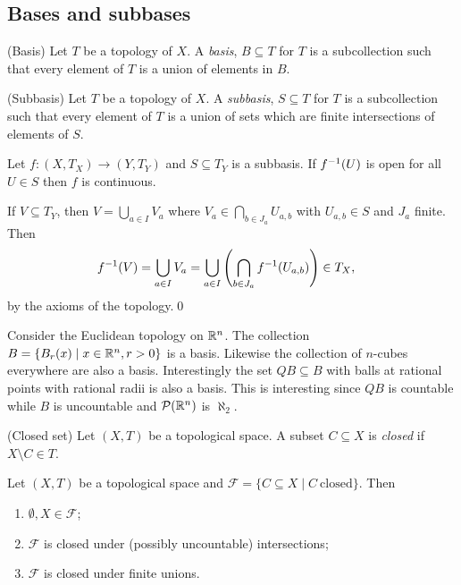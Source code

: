 \documentclass{article}
\begin{document}
\subsection{Bases and subbases}
\begin{definition}
(Basis) Let $ T $ be a topology of $ X $. A \textit{basis}, $ B\subseteq T $ for $ T $ is a subcollection such that every element of $ T $ is a union of elements in $ B $.
\end{definition}
\begin{definition}
	(Subbasis) Let $ T $ be a topology of $ X $. A \textit{subbasis}, $ S\subseteq T $ for $ T $ is a subcollection such that every element of $ T $ is a union of sets which are finite intersections of elements of $ S $.
\end{definition}
\begin{lemma}
  Let $ f:(X,T_X)\to (Y,T_Y) $ and $ S\subseteq T_Y $ is a subbasis. If $ {f}^{-1}(U) $ is open for all $ U\in S $ then $ f $ is continuous.
\end{lemma}
\pf If $ V\subseteq T_Y $, then $ V=\bigcup_{a\in I}V_a $ where $ V_a\in \bigcap_{b\in J_a}U_{a,b} $ with $U_{a,b}\in S $ and $ J_a $ finite. Then
\begin{align*}
	{f}^{-1}(V) = \bigcup_{a\in I}V_a &= \bigcup_{a\in I}\left(\bigcap_{b\in J_a}{f}^{-1}(U_{a,b})\right)\in T_X,
\end{align*}
by the axioms of the topology.\qed
\par
Consider the Euclidean topology on $ \mathbb{R}^n $. The collection $ B= \{B_r(x)\mid x\in \mathbb{R}^n, r>0\} $ is a basis. Likewise the collection of $ n $-cubes everywhere are also a basis. Interestingly the set $ QB \subseteq B $ with balls at rational points with rational radii is also a basis. This is interesting since $ QB $ is countable while $ B $ is uncountable and $ \mathcal P(\mathbb{R}^n) $ is $ \aleph_2 $.
\begin{definition}
	(Closed set) Let $ (X,T) $ be a topological space. A subset $ C\subseteq X $ is \textit{closed} if $ X\setminus C\in T $.
\end{definition}
\begin{proposition}
	Let $ (X,T) $ be a topological space and $ \mathcal F = \{ C\subseteq X \mid C \ \text{closed} \} $. Then
	\begin{enumerate}
		\item $ \emptyset, X\in \mathcal F $;
		\item $ \mathcal F $ is closed under (possibly uncountable) intersections;
		\item $ \mathcal F $ is closed under finite unions.
	\end{enumerate}
\end{proposition}
\end{document}
